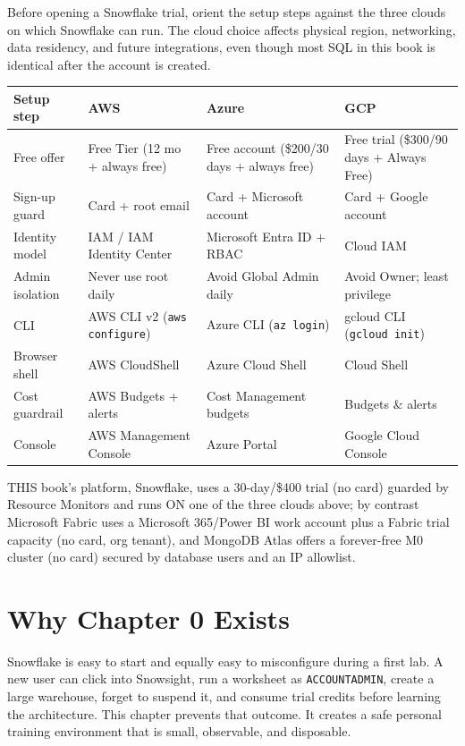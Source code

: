 \begin{crosscloud}
Before opening a Snowflake trial, orient the setup steps against the three clouds on which Snowflake can run. The cloud choice affects physical region, networking, data residency, and future integrations, even though most SQL in this book is identical after the account is created.

\vspace{2mm}
{\footnotesize
\begin{tabular}{@{}p{2.9cm}p{3.0cm}p{3.0cm}p{3.0cm}@{}}
\toprule
\textbf{Setup step} & \textbf{AWS} & \textbf{Azure} & \textbf{GCP} \\
\midrule
Free offer & Free Tier (12 mo + always free) & Free account (\$200/30 days + always free) & Free trial (\$300/90 days + Always Free) \\
Sign-up guard & Card + root email & Card + Microsoft account & Card + Google account \\
Identity model & IAM / IAM Identity Center & Microsoft Entra ID + RBAC & Cloud IAM \\
Admin isolation & Never use root daily & Avoid Global Admin daily & Avoid Owner; least privilege \\
CLI & AWS CLI v2 (\texttt{aws configure}) & Azure CLI (\texttt{az login}) & gcloud CLI (\texttt{gcloud init}) \\
Browser shell & AWS CloudShell & Azure Cloud Shell & Cloud Shell \\
Cost guardrail & AWS Budgets + alerts & Cost Management budgets & Budgets \& alerts \\
Console & AWS Management Console & Azure Portal & Google Cloud Console \\
\bottomrule
\end{tabular}}

\vspace{1mm}
THIS book's platform, Snowflake, uses a 30-day/\$400 trial (no card) guarded by Resource Monitors and runs ON one of the three clouds above; by contrast Microsoft Fabric uses a Microsoft 365/Power BI work account plus a Fabric trial capacity (no card, org tenant), and MongoDB Atlas offers a forever-free M0 cluster (no card) secured by database users and an IP allowlist.
\end{crosscloud}

\section{Why Chapter 0 Exists}
Snowflake is easy to start and equally easy to misconfigure during a first lab. A new user can click into Snowsight, run a worksheet as \texttt{ACCOUNTADMIN}, create a large warehouse, forget to suspend it, and consume trial credits before learning the architecture. This chapter prevents that outcome. It creates a safe personal training environment that is small, observable, and disposable.


